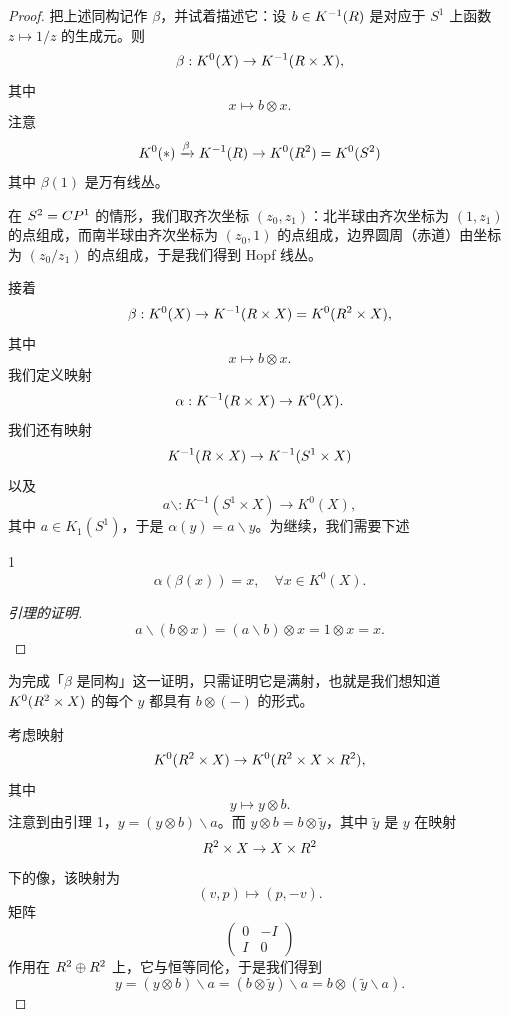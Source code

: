 \begin{proof}
把上述同构记作 $\beta$，并试着描述它：设 $b\in K^{-1}(R)$ 是对应于 $S^1$ 上函数 $z\mapsto 1/z$ 的生成元。则
\[ \beta: K^0(X)\to K^{-1}(R\times X), \]
其中
\[ x\mapsto b\otimes x. \]
注意
\[ K^0(*)\xrightarrow{\beta} K^{-1}(R)\to K^0(R^2)= K^0(S^2) \]
其中 $\beta(1)$ 是万有线丛。


在 $S^2=C P^1$ 的情形，我们取齐次坐标 $(z_0,z_1)$：北半球由齐次坐标为 $(1,z_1)$ 的点组成，而南半球由齐次坐标为 $(z_0,1)$ 的点组成，边界圆周（赤道）由坐标为 $(z_0/z_1)$ 的点组成，于是我们得到 Hopf 线丛。

接着
\[ \beta: K^0(X)\to K^{-1}(R\times X)=K^0(R^2\times X), \]
其中
\[ x\mapsto b\otimes x. \]
我们定义映射
\[ \alpha: K^{-1}(R\times X)\to K^0(X). \]
我们还有映射
\[ K^{-1}(R\times X)\to K^{-1}(S^1\times X) \]
以及
\[ a\backslash: K^{-1}(S^1\times X)\to K^0(X), \]
其中 $a\in K_1(S^1)$，于是 $\alpha(y)=a\backslash y$。为继续，我们需要下述

\begin{lem}{1}
\[ \alpha(\beta(x))=x,\quad \forall x\in K^0(X). \]
\end{lem}

\begin{proof}[引理的证明]
\[ a\backslash(b\otimes x)=(a\backslash b)\otimes x=1\otimes x=x. \]
\end{proof}


为完成「$\beta$ 是同构」这一证明，只需证明它是满射，也就是我们想知道 $K^0(R^2\times X)$ 的每个 $y$ 都具有 $b\otimes(-)$ 的形式。

考虑映射
\[ K^0(R^2\times X)\to K^0(R^2\times X\times R^2), \]
其中
\[ y\mapsto y\otimes b. \]
注意到由引理 1，$y=(y\otimes b)\backslash a$。而 $y\otimes b=b\otimes\tilde y$，其中 $\tilde y$ 是 $y$ 在映射
\[ R^2\times X\to X\times R^2 \]
下的像，该映射为
\[ (v,p)\mapsto(p,-v). \]
矩阵
\[ \begin{pmatrix} 0 & -I \\ I & 0\end{pmatrix} \]
作用在 $R^2\oplus R^2$ 上，它与恒等同伦，于是我们得到
\[ y=(y\otimes b)\backslash a=(b\otimes\tilde y)\backslash a=b\otimes(\tilde y\backslash a). \]
\end{proof}

